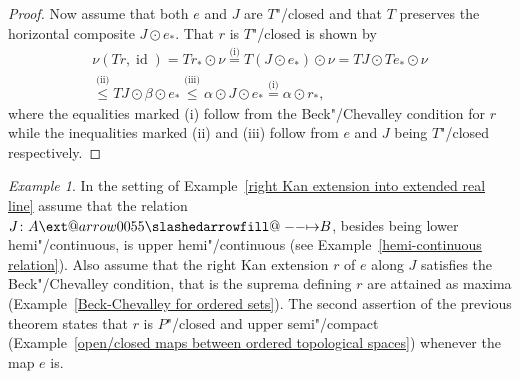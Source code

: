 \documentclass[preprint, a4paper]{elsarticle}
\makeatletter
\def\slashedarrowfill@#1#2#3#4#5{%
  $\m@th\thickmuskip0mu\medmuskip\thickmuskip\thinmuskip\thickmuskip
   \relax#5#1\mkern-7mu%
   \cleaders\hbox{$#5\mkern-2mu#2\mkern-2mu$}\hfill
   \mathclap{#3}\mathclap{#2}%
   \cleaders\hbox{$#5\mkern-2mu#2\mkern-2mu$}\hfill
   \mkern-7mu#4$%
}
\def\rightslashedarrowfill@{%
  \slashedarrowfill@\relbar\relbar\mapstochar\rightarrow}
\newcommand\xslashedrightarrow[2][]{%
  \ext@arrow 0055{\rightslashedarrowfill@}{#1}{#2}}
\def\slashedrightarrow{\xslashedrightarrow{}}
\theoremstyle{definition}
\theoremstyle{remark}
\newtheorem{example}[theorem]{Example}
\providecommand{\exref}[1]{Example~\ref{#1}}
\providecommand{\hmap}[3]{#1\colon#2\slashedrightarrow#3}
\DeclareMathOperator{\id}{id}
\providecommand{\2}{\mathsf 2}
\providecommand{\hc}{\odot}
\makeatother
\begin{document}
\begin{proof}
		Now assume that both $e$ and $J$ are $T$"/closed and that $T$ preserves the horizontal composite $J \hc e_*$. That $r$ is $T$"/closed is shown by
		\begin{multline*}
			\nu(Tr, \id) = Tr_* \hc \nu \overset{\text{(i)}}= T(J \hc e_*) \hc \nu = TJ \hc Te_* \hc \nu\\
			\overset{\text{(ii)}}\leq TJ \hc \beta \hc e_* \overset{\text{(iii)}}\leq \alpha \hc J \hc e_* \overset{\text{(i)}}= \alpha \hc r_*,
		\end{multline*}
		where the equalities marked (i) follow from the Beck"/Chevalley condition for $r$ while the inequalities marked (ii) and (iii) follow from $e$ and $J$ being $T$"/closed respectively.
	\end{proof}
	
	\begin{example}
		In the setting of \exref{right Kan extension into extended real line} assume that the relation $\hmap JAB$, besides being lower hemi"/continuous, is upper hemi"/continuous (see \exref{hemi-continuous relation}). Also assume that the right Kan extension $r$ of $e$ along $J$ satisfies the Beck"/Chevalley condition, that is the suprema defining $r$ are attained as maxima (\exref{Beck-Chevalley for ordered sets}). The second assertion of the previous theorem states that $r$ is $P$"/closed and upper semi"/compact (\exref{open/closed maps between ordered topological spaces}) whenever the map $e$ is. 
	\end{example}
	
\end{document}
